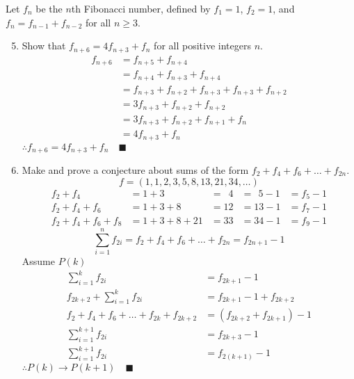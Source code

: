 \documentclass[letterpaper, 12pt]{article}
\newcommand{\qed}{\quad \blacksquare}
\newcommand{\then}{\rightarrow}
\newcommand{\0}{\emptyset}
\begin{document}
\pagebreak
Let $f_n$ be the $n$th Fibonacci number, defined by $f_1 = 1$, $f_2 = 1$, and 
$f_n = f_{n-1} + f_{n-2}$ for all $n \ge 3$.
\begin{enumerate}[resume]
\setcounter{enumi}{4}
\item Show that $f_{n+6} = 4f_{n+3} + f_n$ for all positive integers $n$.
\begin{align*}
    f_{n+6} &= f_{n+5} + f_{n+4} \\
    &= f_{n+4} + f_{n+3} + f_{n+4} \\
    &= f_{n+3} + f_{n+2} + f_{n+3} + f_{n+3} + f_{n+2} \\
    &= 3f_{n+3} + f_{n+2} + f_{n+2} \\
    &= 3f_{n+3} + f_{n+2} + f_{n+1} + f_n \\
    &= 4f_{n+3} + f_n
\end{align*}
$\therefore f_{n+6} = 4f_{n+3} + f_n \qed$
\item Make and prove a conjecture about sums of the form $f_2 + f_4 + f_6 + \dots + f_{2n}$.
\[f = (1, 1, 2, 3, 5, 8, 13, 21, 34, \dots)\]
\begin{align*}
    f_2 + f_4 &= 1 + 3 &= \;\:4 &= \;\,5 - 1 &= f_5 - 1 \\
    f_2 + f_4 + f_6 &= 1 + 3 + 8 &= 12 &= 13 - 1 &= f_7 - 1 \\
    f_2 + f_4 + f_6 + f_8 &= 1 + 3 + 8 + 21 &= 33 &= 34 - 1 &= f_9 - 1
\end{align*}
\[\sum_{i = 1}^{n} f_{2i} = f_2 + f_4 + f_6 + \dots + f_{2n} = f_{2n + 1} - 1\]
Assume $P(k)$
\begin{align*}
    \sum_{i = 1}^{k} f_{2i} &= f_{2k + 1} - 1 \\
    f_{2k + 2} + \sum_{i = 1}^{k} f_{2i} &= f_{2k + 1} - 1 + f_{2k + 2} \\
    f_2 + f_4 + f_6 + \dots + f_{2k} + f_{2k + 2} &= (f_{2k + 2} + f_{2k + 1}) - 1 \\
    \sum_{i = 1}^{k+1} f_{2i} &= f_{2k + 3} - 1 \\
    \sum_{i = 1}^{k+1} f_{2i} &= f_{2(k + 1)} - 1
\end{align*}
$\therefore P(k) \then P(k + 1) \qed$
\end{enumerate}
\end{document}
